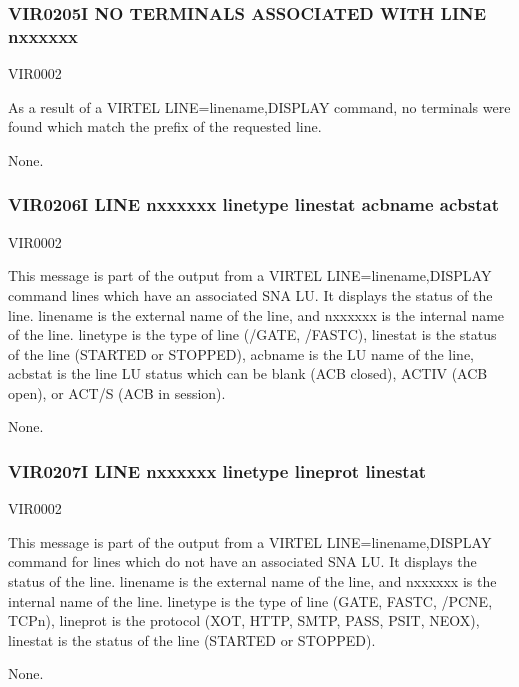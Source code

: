 \documentclass[letterpaper,10pt,english]{sphinxmanual}
\begin{document}
\subsubsection{VIR0205I NO TERMINALS ASSOCIATED WITH LINE n\sphinxhyphen{}xxxxxx}
\label{\detokenize{messages:vir0205i-no-terminals-associated-with-line-n-xxxxxx}}\begin{description}
\sphinxAtStartPar
VIR0002

\sphinxAtStartPar
As a result of a VIRTEL LINE=linename,DISPLAY command, no terminals were found which match the prefix of the requested line.

\sphinxAtStartPar
None.

\end{description}


\subsubsection{VIR0206I LINE n\sphinxhyphen{}xxxxxx linetype linestat acbname acbstat}
\label{\detokenize{messages:vir0206i-line-n-xxxxxx-linetype-linestat-acbname-acbstat}}\begin{description}
\sphinxAtStartPar
VIR0002

\sphinxAtStartPar
This message is part of the output from a VIRTEL LINE=linename,DISPLAY command lines which have an associated SNA LU. It displays the status of the line. linename is the external name of the line, and n\sphinxhyphen{}xxxxxx is the internal  name of the line. linetype is the type of line (/GATE, /FASTC), linestat is the status of the line (STARTED or STOPPED),
acbname is the LU name of the line, acbstat is the line LU status which can be blank (ACB closed), ACTIV (ACB open), or ACT/S (ACB in session).

\sphinxAtStartPar
None.

\end{description}


\subsubsection{VIR0207I LINE n\sphinxhyphen{}xxxxxx linetype lineprot linestat}
\label{\detokenize{messages:vir0207i-line-n-xxxxxx-linetype-lineprot-linestat}}\begin{description}
\sphinxAtStartPar
VIR0002

\sphinxAtStartPar
This message is part of the output from a VIRTEL LINE=linename,DISPLAY command for lines which do not have an associated SNA LU. It displays the status of the line. linename is the external name of the line, and n\sphinxhyphen{}xxxxxx is the internal name of the line. linetype is the type of line (GATE, FASTC, /PCNE, TCPn), lineprot is the protocol (XOT, HTTP, SMTP, PASS, PSIT, NEOX), linestat is the status of the line (STARTED or STOPPED).

\sphinxAtStartPar
None.

\end{description}
\end{document}

